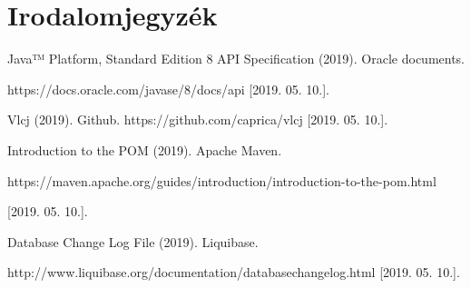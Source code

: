 \chapter*{Irodalomjegyzék}


\setlength\parindent{0pt}
Java™ Platform, Standard Edition 8 API Specification (2019). Oracle documents. 

https://docs.oracle.com/javase/8/docs/api
[2019. 05. 10.].

\vspace{1cm}

\setlength\parindent{0pt}
Vlcj (2019). Github.
https://github.com/caprica/vlcj [2019. 05. 10.].

\vspace{1cm}

\setlength\parindent{0pt}
Introduction to the POM (2019). Apache Maven.

https://maven.apache.org/guides/introduction/introduction-to-the-pom.html

[2019. 05. 10.].

\vspace{1cm}

\setlength\parindent{0pt}
Database Change Log File (2019). Liquibase.

http://www.liquibase.org/documentation/databasechangelog.html [2019. 05. 10.].